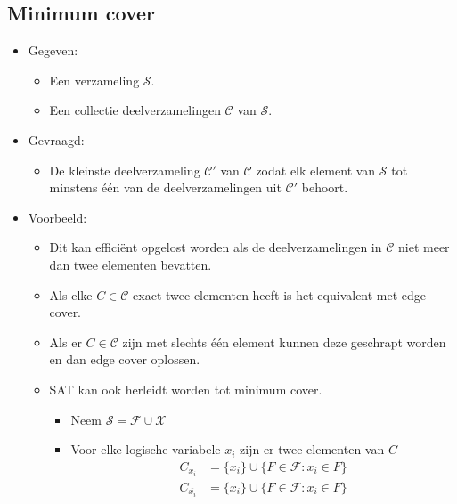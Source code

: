 \subsection{Minimum cover}
\begin{itemize}
    \item Gegeven:
    \begin{itemize}
        \item Een verzameling $\mathcal{S}$.
        \item Een collectie deelverzamelingen $\mathcal{C}$ van $\mathcal{S}$.
    \end{itemize}
    \item Gevraagd:
    \begin{itemize}
        \item De kleinste deelverzameling $\mathcal{C}'$ van $\mathcal{C}$ zodat elk element van $\mathcal{S}$ tot minstens één van de deelverzamelingen uit $\mathcal{C}'$ behoort.
    \end{itemize}
    \item Voorbeeld:
    \begin{itemize}
        \item Dit kan efficiënt opgelost worden als de deelverzamelingen in $\mathcal{C}$ niet meer dan twee elementen bevatten.                      
        \item Als elke $C \in \mathcal{C}$ exact twee elementen heeft is het equivalent met edge cover.
        \item Als er $C \in \mathcal{C}$ zijn met slechts één element kunnen deze geschrapt worden en dan edge cover oplossen.
        \item SAT kan ook herleidt worden tot minimum cover.
        \begin{itemize}
            \item Neem $\mathcal{S} = \mathcal{F} \cup \mathcal{X}$
            \item Voor elke logische variabele $x_i$ zijn er twee elementen van $C$
            \begin{align*}
                C_{x_i} &= \{x_i \} \cup \{F \in \mathcal{F} : x_i \in F \}\\
                C_{\overline{x_i}} &= \{x_i \} \cup \{F \in \mathcal{F} : \overline{x_i} \in F \}
            \end{align*}
        \end{itemize}
    \end{itemize}
\end{itemize}

